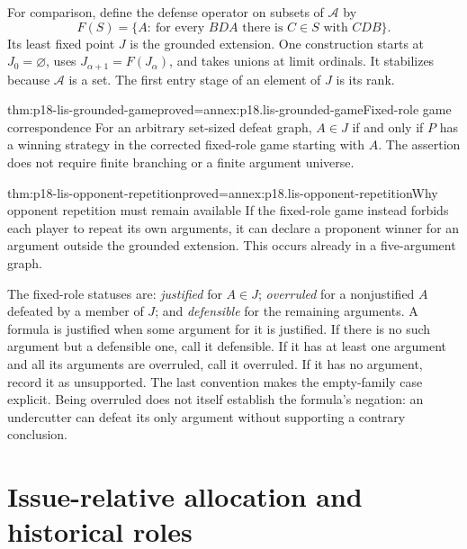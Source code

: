 For comparison, define the defense operator on subsets of
\(\mathcal A\) by
\[
F(S)=\{A:\ \text{for every }BDA
             \text{ there is }C\in S\text{ with }CDB\}.
\]
Its least fixed point \(J\) is the grounded extension.
One construction starts at \(J_0=\varnothing\), uses
\(J_{\alpha+1}=F(J_\alpha)\), and takes unions at limit ordinals.
It stabilizes because \(\mathcal A\) is a set.
The first entry stage of an element of \(J\) is its rank.

\begin{hbtheorem}{thm:p18-lis-grounded-game}{proved=annex:p18.lis-grounded-game}{Fixed-role game correspondence}
For an arbitrary set-sized defeat graph, \(A\in J\) if and only if
\(P\) has a winning strategy in the corrected fixed-role game
starting with \(A\). The assertion does not require finite branching
or a finite argument universe.
\end{hbtheorem}

\begin{hbtheorem}{thm:p18-lis-opponent-repetition}{proved=annex:p18.lis-opponent-repetition}{Why opponent repetition must remain available}
If the fixed-role game instead forbids each player to repeat its own
arguments, it can declare a proponent winner for an argument outside
the grounded extension. This occurs already in a five-argument graph.
\end{hbtheorem}

The fixed-role statuses are:
\emph{justified} for \(A\in J\);
\emph{overruled} for a nonjustified \(A\) defeated by a member of \(J\);
and \emph{defensible} for the remaining arguments.
A formula is justified when some argument for it is justified.
If there is no such argument but a defensible one, call it defensible.
If it has at least one argument and all its arguments are overruled,
call it overruled. If it has no argument, record it as unsupported.
The last convention makes the empty-family case explicit.
Being overruled does not itself establish the formula's negation:
an undercutter can defeat its only argument without supporting a
contrary conclusion.

\section{Issue-relative allocation and historical roles}
\label{sec:p18-lis-burden-input}

